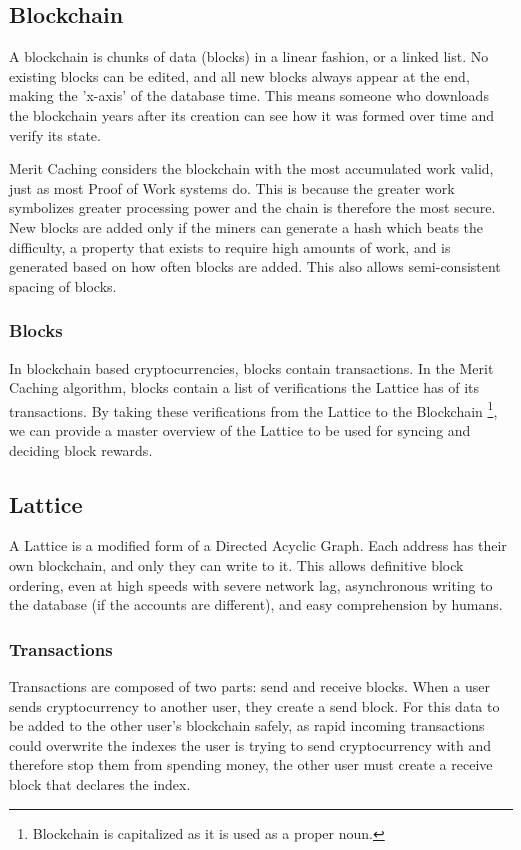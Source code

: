 \documentclass[14pt]{article}
\begin{document}
\subsection{Blockchain}
A blockchain is chunks of data (blocks) in a linear fashion, or a linked list. No existing blocks can be edited, and all new blocks always appear at the end, making the 'x-axis' of the database time. This means someone who downloads the blockchain years after its creation can see how it was formed over time and verify its state. 

Merit Caching considers the blockchain with the most accumulated work valid, just as most Proof of Work systems do. This is because the greater work symbolizes greater processing power and the chain is therefore the most secure. New blocks are added only if the miners can generate a hash which beats the difficulty, a property that exists to require high amounts of work, and is generated based on how often blocks are added. This also allows semi-consistent spacing of blocks.

\subsubsection{Blocks}
In blockchain based cryptocurrencies, blocks contain transactions. In the Merit Caching algorithm, blocks contain a list of verifications the Lattice has of its transactions. By taking these verifications from the Lattice to the Blockchain \footnote{Blockchain is capitalized as it is used as a proper noun.}, we can provide a master overview of the Lattice to be used for syncing and deciding block rewards.

\subsection{Lattice}
A Lattice is a modified form of a Directed Acyclic Graph. Each address has their own blockchain, and only they can write to it. This allows definitive block ordering, even at high speeds with severe network lag, asynchronous writing to the database (if the accounts are different), and easy comprehension by humans.

\subsubsection{Transactions}
Transactions are composed of two parts: send and receive blocks. When a user sends cryptocurrency to another user, they create a send block. For this data to be added to the other user's blockchain safely, as rapid incoming transactions could overwrite the indexes the user is trying to send cryptocurrency with and therefore stop them from spending money, the other user must create a receive block that declares the index.
\end{document}
